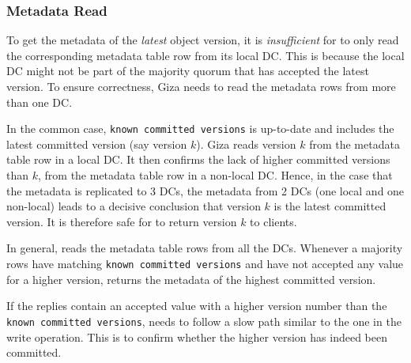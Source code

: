 \subsubsection{Metadata Read}

To get the metadata of the \emph{latest} object version, it is {\em insufficient} for
\name to only read the corresponding metadata table row from its local DC. This
is because the local DC might not be part of the majority quorum that has
accepted the latest version. To ensure correctness, Giza needs to read the
metadata rows from more than one DC.

In the common case, {\tt known committed versions} is up-to-date and
includes the latest committed version (say version $k$).
Giza reads version $k$ from the metadata table row in a local DC.
It then confirms the lack of higher committed versions than $k$,
from the metadata table row in a non-local DC.
Hence, in the case that the metadata is replicated to 3 DCs, 
the metadata from 2 DCs (one local and one non-local) 
leads to a decisive conclusion that version $k$ is the
latest committed version. It is therefore safe for \name to return
version $k$ to clients.

In general, \name reads the metadata table rows from all the DCs.
Whenever a majority rows have matching {\tt known committed versions} and have
not accepted any value for a higher version, \name returns the metadata
of the highest committed version.

If the replies contain an accepted value with a higher version number than the
{\tt known committed versions}, \name needs to follow a slow path
similar to the one in the write operation. This is to confirm whether the higher
version has indeed been committed.


